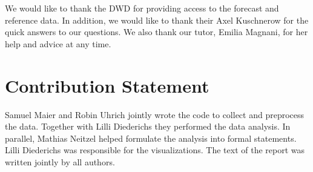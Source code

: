 \documentclass{article}
\theoremstyle{plain}
\theoremstyle{definition}
\theoremstyle{remark}
\begin{document}
We would like to thank the DWD for providing access to the forecast and
reference data. In addition, we would like to thank their Axel Kuschnerow for
the quick answers to our questions. We also thank our tutor, Emilia Magnani,
for her help and advice at any time.

\section*{Contribution Statement}

Samuel Maier and Robin Uhrich jointly wrote the code to collect and preprocess
the data. Together with Lilli Diederichs they performed the data analysis. In
parallel, Mathias Neitzel helped formulate the analysis into formal statements.
Lilli Diederichs was responsible for the visualizations. The text of the report
was written jointly by all authors.



\newpage


\end{document}
